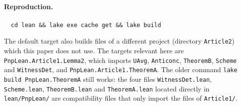 \documentclass[11pt,a4paper]{article}
\theoremstyle{definition}
\theoremstyle{remark}
\begin{document}
\paragraph{Reproduction.}
\begin{verbatim}
  cd lean && lake exe cache get && lake build
\end{verbatim}
The default target also builds files of a different project (directory \texttt{Article2})
which this paper does not use. The targets relevant here are
\texttt{PnpLean.Article1.Lemma2}, which imports \texttt{UAvg}, \texttt{Anticonc},
\texttt{TheoremB}, \texttt{Scheme} and \texttt{WitnessDet}, and
\texttt{PnpLean.Article1.TheoremA}. The older command
\texttt{lake build PnpLean.TheoremA} still works: the four files \texttt{WitnessDet.lean},
\texttt{Scheme.lean}, \texttt{TheoremB.lean} and \texttt{TheoremA.lean} located directly in
\texttt{lean/PnpLean/} are compatibility files that only import the files of
\texttt{Article1/}.
\end{document}
